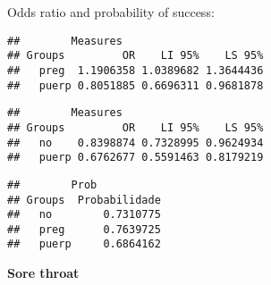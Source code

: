 \documentclass[
]{article}
\newenvironment{Shaded}{\begin{snugshade}}{\end{snugshade}}
\newcommand{\CommentTok}[1]{\textcolor[rgb]{0.56,0.35,0.01}{\textit{#1}}}
\newcommand{\KeywordTok}[1]{\textcolor[rgb]{0.13,0.29,0.53}{\textbf{#1}}}
\newcommand{\NormalTok}[1]{#1}
\newcommand{\OperatorTok}[1]{\textcolor[rgb]{0.81,0.36,0.00}{\textbf{#1}}}
\begin{document}
Odds ratio and probability of success:

\begin{Shaded}
\end{Shaded}

\begin{verbatim}
##        Measures
## Groups         OR    LI 95%    LS 95%
##   preg  1.1906358 1.0389682 1.3644436
##   puerp 0.8051885 0.6696311 0.9681878
\end{verbatim}

\begin{Shaded}
\end{Shaded}

\begin{verbatim}
##        Measures
## Groups         OR    LI 95%    LS 95%
##   no    0.8398874 0.7328995 0.9624934
##   puerp 0.6762677 0.5591463 0.8179219
\end{verbatim}

\begin{Shaded}
\end{Shaded}

\begin{verbatim}
##        Prob
## Groups  Probabilidade
##   no        0.7310775
##   preg      0.7639725
##   puerp     0.6864162
\end{verbatim}

\textbf{Sore throat}
\end{document}
